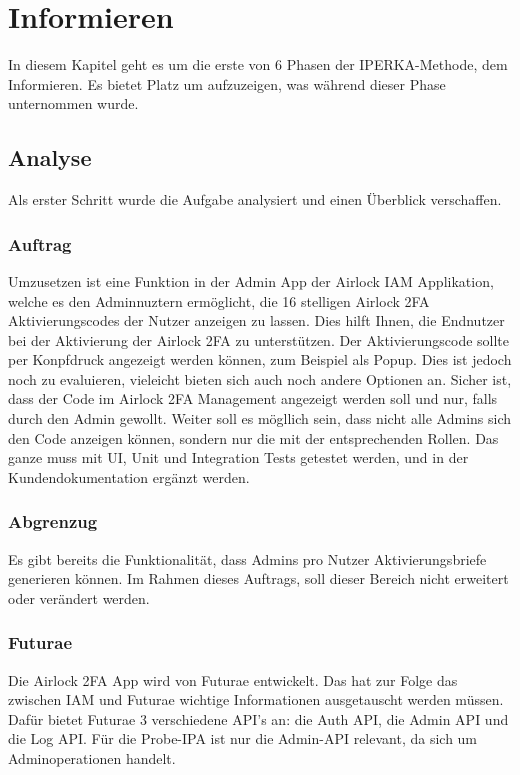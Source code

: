 \chapter{Informieren}\label{ch:informieren}

In diesem Kapitel geht es um die erste von 6 Phasen der IPERKA-Methode, dem Informieren. Es bietet Platz um aufzuzeigen, was während dieser Phase unternommen wurde.

\section{Analyse}
Als erster Schritt wurde die Aufgabe analysiert und einen Überblick verschaffen.
\subsection*{Auftrag}
Umzusetzen ist eine Funktion in der Admin App der Airlock IAM Applikation, welche es den Adminnuztern ermöglicht, die 16 stelligen Airlock 2FA Aktivierungscodes der Nutzer anzeigen zu lassen. Dies hilft Ihnen, die Endnutzer bei der Aktivierung der Airlock 2FA zu unterstützen. Der Aktivierungscode sollte per Konpfdruck angezeigt werden können, zum Beispiel als Popup. Dies ist jedoch noch zu evaluieren, vieleicht bieten sich auch noch andere Optionen an. Sicher ist, dass der Code im Airlock 2FA Management angezeigt werden soll und nur, falls durch den Admin gewollt. \newline
Weiter soll es mögllich sein, dass nicht alle Admins sich den Code anzeigen können, sondern nur die mit der entsprechenden Rollen. \newline
Das ganze muss mit UI, Unit und Integration Tests getestet werden, und in der Kundendokumentation ergänzt werden.

\subsection*{Abgrenzug}
Es gibt bereits die Funktionalität, dass Admins pro Nutzer Aktivierungsbriefe generieren können. Im Rahmen dieses Auftrags, soll dieser Bereich nicht erweitert oder verändert werden.

\subsection{Futurae}
Die Airlock 2FA App wird von Futurae entwickelt. Das hat zur Folge das zwischen IAM und Futurae wichtige Informationen ausgetauscht werden müssen. Dafür bietet Futurae 3 verschiedene API's an: die Auth API, die Admin API und die Log API. Für die Probe-IPA ist nur die Admin-API relevant, da sich um Adminoperationen handelt. 

